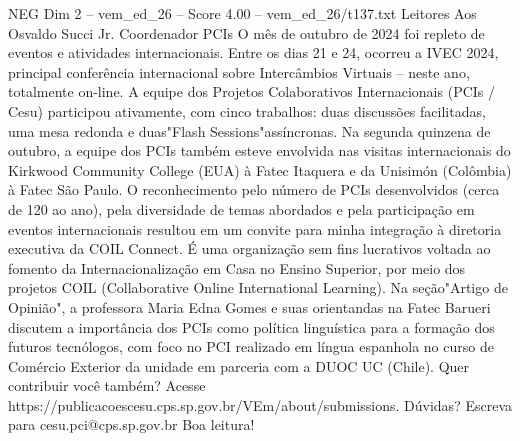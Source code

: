 \begin{textsample}{NEG Dim 2 – vem\_ed\_26 – Score 4.00 – vem\_ed\_26/t137.txt}  \label{ex:f2_neg_166}
Leitores Aos Osvaldo Succi Jr.
Coordenador PCIs O mês de outubro de 2024 foi repleto de eventos e atividades internacionais.
Entre os dias 21 e 24, ocorreu a IVEC 2024, principal conferência internacional sobre Intercâmbios Virtuais – neste ano, totalmente on-line.
A equipe dos Projetos Colaborativos Internacionais (PCIs / Cesu) participou ativamente, com cinco trabalhos: duas discussões facilitadas, uma mesa redonda e duas"Flash Sessions"assíncronas.
Na segunda quinzena de outubro, a equipe dos PCIs também esteve envolvida nas visitas internacionais do Kirkwood Community College (EUA) à Fatec Itaquera e da Unisimón (Colômbia) à Fatec São Paulo.
O reconhecimento pelo número de PCIs desenvolvidos (cerca de 120 ao ano), pela diversidade de temas abordados e pela participação em eventos internacionais resultou em um convite para minha integração à diretoria executiva da COIL Connect.
É uma organização sem fins lucrativos voltada ao fomento da Internacionalização em Casa no Ensino Superior, por meio dos projetos COIL (Collaborative Online International Learning).
Na seção"Artigo de Opinião", a professora Maria Edna Gomes e suas orientandas na Fatec Barueri discutem a importância dos PCIs como política linguística para a formação dos futuros tecnólogos, com foco no PCI realizado em língua espanhola no curso de Comércio Exterior da unidade em parceria com a DUOC UC (Chile).
Quer contribuir você também?
Acesse https://publicacoescesu.cps.sp.gov.br/VEm/about/submissions.
Dúvidas?
Escreva para cesu.pci@cps.sp.gov.br Boa leitura!

\end{textsample}
